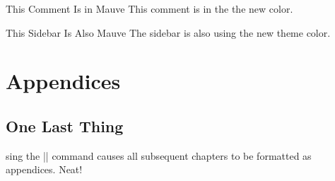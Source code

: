 \documentclass[letterpaper,twocolumn,openany,nodeprecatedcode]{dndbook}
\begin{document}
\begingroup
\DndSetThemeColor[PhbMauve]

\begin{DndComment}{This Comment Is in Mauve}
  This comment is in the the new color.
\end{DndComment}

\begin{DndSidebar}{This Sidebar Is Also Mauve}
  The sidebar is also using the new theme color.
\end{DndSidebar}
\endgroup

\part{Appendices}

\appendix

\chapter{One Last Thing}

sing the |\appendix| command causes all subsequent chapters to be formatted as appendices. Neat!
\end{document}

